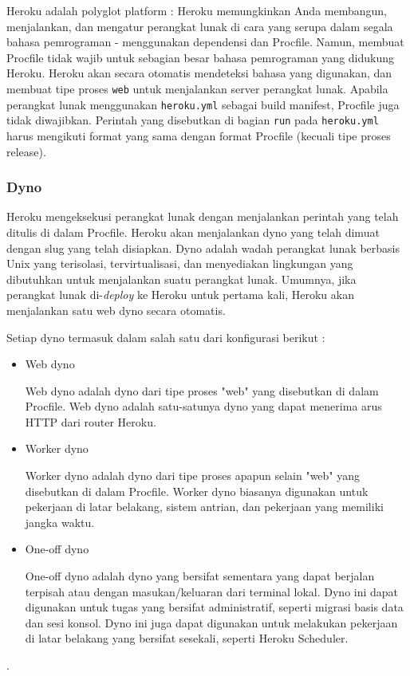 Heroku adalah polyglot platform : Heroku memungkinkan Anda membangun, menjalankan, dan mengatur perangkat lunak di cara yang serupa dalam segala bahasa pemrograman - menggunakan dependensi dan Procfile. Namun, membuat Procfile tidak wajib untuk sebagian besar bahasa pemrograman yang didukung Heroku. Heroku akan secara otomatis mendeteksi bahasa yang digunakan, dan membuat tipe proses \texttt{web} untuk menjalankan server perangkat lunak. Apabila perangkat lunak menggunakan \texttt{heroku.yml} sebagai build manifest, Procfile juga tidak diwajibkan. Perintah yang disebutkan di bagian \texttt{run} pada \texttt{heroku.yml} harus mengikuti format yang sama dengan format Procfile (kecuali tipe proses release).

\subsubsection{Dyno}
Heroku mengeksekusi perangkat lunak dengan menjalankan perintah yang telah ditulis di dalam Procfile. Heroku akan menjalankan dyno yang telah dimuat dengan slug yang telah disiapkan. Dyno adalah wadah perangkat lunak berbasis Unix yang terisolasi, tervirtualisasi, dan menyediakan lingkungan yang dibutuhkan untuk menjalankan suatu perangkat lunak. Umumnya, jika perangkat lunak di-\textit{deploy} ke Heroku untuk pertama kali, Heroku akan menjalankan satu web dyno secara otomatis.

Setiap dyno termasuk dalam salah satu dari konfigurasi berikut :
\begin{itemize}
\item Web dyno

Web dyno adalah dyno dari tipe proses "web" yang disebutkan di dalam Procfile. Web dyno adalah satu-satunya dyno yang dapat menerima arus HTTP dari router Heroku.

\item Worker dyno

Worker dyno adalah dyno dari tipe proses apapun selain "web" yang disebutkan di dalam Procfile. Worker dyno biasanya digunakan untuk pekerjaan di latar belakang, sistem antrian, dan pekerjaan yang memiliki jangka waktu.
\item One-off dyno

One-off dyno adalah dyno yang bersifat sementara yang dapat berjalan terpisah atau dengan masukan/keluaran dari terminal lokal. Dyno ini dapat digunakan untuk tugas yang bersifat administratif, seperti migrasi basis data dan sesi konsol. Dyno ini juga dapat digunakan untuk melakukan pekerjaan di latar belakang yang bersifat sesekali, seperti Heroku Scheduler.

\end{itemize}. 

